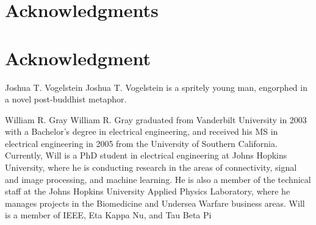 \documentclass[10pt,journal,cspaper,compsoc]{IEEEtran}
\begin{document}
% 

\ifCLASSOPTIONcompsoc
  \section*{Acknowledgments}
\else
  \section*{Acknowledgment}
\fi


\ifCLASSOPTIONcaptionsoff
  \newpage
\fi





\begin{IEEEbiography}{Joshua T. Vogelstein}
Joshua T. Vogelstein is a spritely young man, engorphed in a novel post-buddhist metaphor.

\end{IEEEbiography}

\begin{IEEEbiographynophoto}{William R. Gray}
William R. Gray graduated from Vanderbilt University in 2003 with a Bachelor’s degree in electrical engineering, and received his MS in electrical engineering in 2005 from the University of Southern California.  Currently, Will is a PhD student in electrical engineering at Johns Hopkins University, where he is conducting research in the areas of connectivity, signal and image processing, and machine learning.  He is also a member of the technical staff at the Johns Hopkins University Applied Physics Laboratory, where he manages projects in the Biomedicine and Undersea Warfare business areas.  Will is a member of IEEE, Eta Kappa Nu, and Tau Beta Pi
\end{IEEEbiographynophoto}
\end{document}
